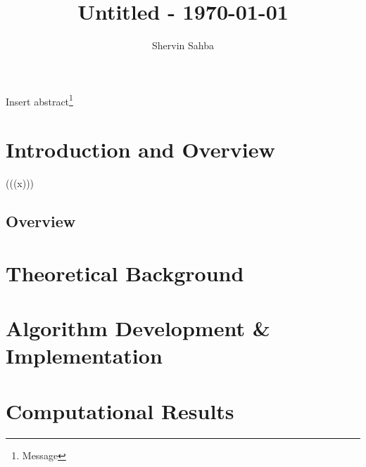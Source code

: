 \documentclass{shervin} %
\begin{document}
\title{Untitled - \today}

\author{Shervin Sahba}
\address{Department of Physics, University of Washington, Seattle, USA.}




\begin{abstract*}
Insert abstract\footnote{Message}
\end{abstract*}


\section{Introduction and Overview}

\begin{boxed}{(((x)))}\end{boxed}


\subsection{Overview}

\medskip
\section{Theoretical Background} \label{sec:Background}

\medskip
\section{Algorithm Development \& Implementation} \label{sec:Methods}

\medskip{}
\section{Computational Results} \label{sec:Results}
\end{document}
